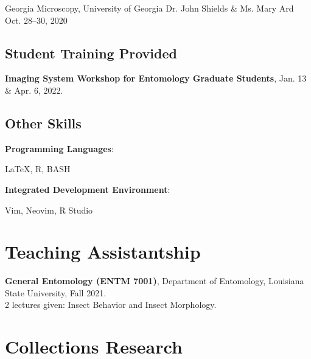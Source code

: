 \documentclass{article}
\newcommand{\hindent}{\hangindent=10pt}
\begin{document}
{Georgia Microscopy, University of Georgia}
{Dr. John Shields \& Ms. Mary Ard}
{Oct. 28--30, 2020}

\subsection{Student Training Provided}
\textbf{Imaging System Workshop for Entomology Graduate Students}, 
\small{Jan. 13 \& Apr. 6, 2022.}\normalsize

\subsection{Other Skills}
\newcommand{\skills}[2]{
    \noindent
    \begin{minipage}[t]{.50\textwidth}
    \textbf{#1}:
    \end{minipage}
    \begin{minipage}[t]{.45\textwidth}
    {#2}\hfill
    \end{minipage}
    \normalsize \par
}

\skills{Programming Languages}{\LaTeX, R, BASH}
\skills{Integrated Development Environment}{Vim, Neovim, R Studio}

\section{Teaching Assistantship}
\newcommand{\TA}[5]{
    \noindent
    \hindent
    \textbf{#1}, %
    {#2}, %
    {#3}, %
    {#4}.\\ %
    \small{#5}. %
    \normalsize\par
}

\TA{General Entomology (ENTM 7001)}
{Department of Entomology}
{Louisiana State University}
{Fall 2021}
{2 lectures given: Insect Behavior and Insect Morphology}

\section{Collections Research}
\newcommand{\entryA}[3]{
    \noindent
    \begin{minipage}[t]{.73\textwidth}
    \textbf{#1}
    \small{#2}
    \end{minipage}
    \begin{minipage}[t]{.25\textwidth}
    \hfill{#3}
    \end{minipage}
    \normalsize \par
}
\end{document}
